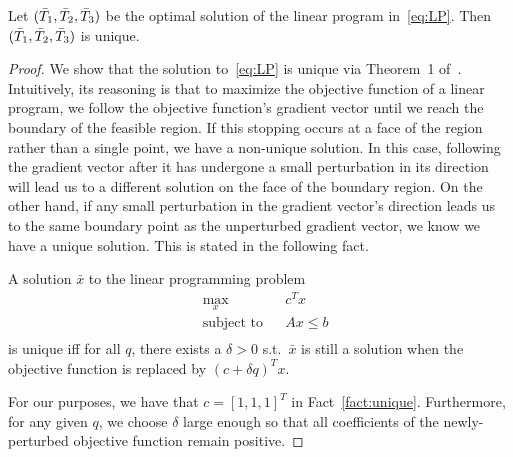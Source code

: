 
\begin{myLemma}
\label{lem:unique}
	Let $(\bar{T}_{1}, \bar{T}_{2}, \bar{T}_{3})$ be the optimal solution of the linear program in~\eqref{eq:LP}.  Then $(\bar{T}_{1}, \bar{T}_{2}, \bar{T}_{3})$  is unique.
\end{myLemma}

\begin{proof}
We show that the solution to~\eqref{eq:LP} is unique via Theorem~1 of~\cite{OLM}.  
Intuitively, its reasoning is that to maximize the objective function of a linear program, we follow the objective function's gradient vector until we reach the boundary of the feasible region.  If this stopping occurs at a face of the region rather than a single point, we have a non-unique solution.  In this case, following the gradient vector after it has undergone a small perturbation in its direction will lead us to a different solution on the face of the boundary region.  On the other hand, if any small perturbation in the gradient vector's direction leads us to the same boundary point as the unperturbed gradient vector, we know we have a unique solution.  This is stated in the following fact.

\begin{fact}
\label{fact:unique}
	A solution $\bar{x}$ to the linear programming problem
	\begin{equation}
	\label{eq:LP_fact}
\begin{aligned}
	& \underset{x}{\text{max}}
	&& c^{T}x\\
	& \text{subject to}
	&& 	Ax \leq b\\
\end{aligned}
\end{equation}
is unique iff for all $q$, there exists a $\delta >0$ s.t.\ $\bar{x}$ is still a solution when the objective function is replaced by $(c + \delta q)^{T}x$.
\end{fact}

For our purposes, we have that $c = [1, 1, 1]^{T}$ in Fact~\ref{fact:unique}. Furthermore, for any given $q$, we choose $\delta$ large enough so that all coefficients of the newly-perturbed objective function remain positive.  


\end{proof}
